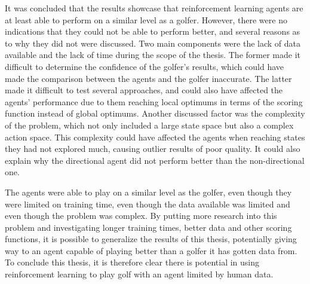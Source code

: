 \documentclass{kththesis}
\begin{document}
It was concluded that the results showcase that reinforcement learning agents are at least able to perform on a similar level as a golfer. However, there were no indications that they could not be able to perform better, and several reasons as to why they did not were discussed. Two main components were the lack of data available and the lack of time during the scope of the thesis. The former made it difficult to determine the confidence of the golfer's results, which could have made the comparison between the agents and the golfer inaccurate. The latter made it difficult to test several approaches, and could also have affected the agents' performance due to them reaching local optimums in terms of the scoring function instead of global optimums. Another discussed factor was the complexity of the problem, which not only included a large state space but also a complex action space. This complexity could have affected the agents when reaching states they had not explored much, causing outlier results of poor quality. It could also explain why the directional agent did not perform better than the non-directional one.

The agents were able to play on a similar level as the golfer, even though they were limited on training time, even though the data available was limited and even though the problem was complex. By putting more research into this problem and investigating longer training times, better data and other scoring functions, it is possible to generalize the results of this thesis, potentially giving way to an agent capable of playing better than a golfer it has gotten data from. To conclude this thesis, it is therefore clear there is potential in using reinforcement learning to play golf with an agent limited by human data.

\printbibliography[heading=bibintoc]

\appendix
\end{document}
